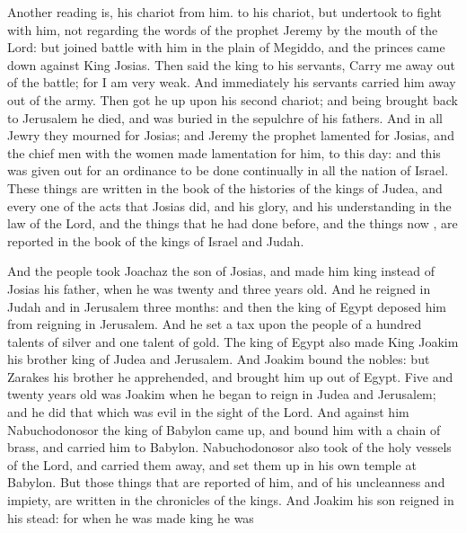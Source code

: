 {{Another reading is,
his chariot from him.} to his chariot, but undertook to fight with him, not regarding the words of the prophet Jeremy
{} by the mouth of the Lord:
but joined battle with him in the plain of Megiddo, and the princes came down against King Josias.
Then said the king to his servants, Carry me away out of the battle; for I am very weak. And immediately his servants carried him away out of the army.
Then got he up upon his second chariot; and being brought back to Jerusalem he died, and was buried in the sepulchre of his fathers.
And in all Jewry they mourned for Josias; and Jeremy the prophet lamented for Josias, and the chief men with the women made lamentation for him, to this day: and this was given out for an ordinance to be done continually in all the nation of Israel.
These things are written in the book of the histories of the kings of Judea, and every one of the acts that Josias did, and his glory, and his understanding in the law of the Lord, and the things that he had done before, and the things now
{}, are reported in the book of the kings of Israel and Judah.
\par }{\PP {} And the people took
 Joachaz the son of Josias, and made him king instead of Josias his father, when he was twenty and three years old.
And he reigned in
 Judah and in Jerusalem three months: and then the king of Egypt deposed him from reigning in Jerusalem.
And he set a tax upon the people of a hundred talents of silver and one talent of gold.
The king of Egypt also made King Joakim his brother king of Judea and Jerusalem.
And Joakim bound the nobles: but Zarakes his brother he apprehended, and brought him up out of Egypt.
Five and twenty years old was
 Joakim when he began to reign in Judea and Jerusalem; and he did that which was evil in the sight of the Lord.
And against him Nabuchodonosor the king of Babylon came up, and bound him with a chain of brass, and carried him to Babylon.
Nabuchodonosor also took of the holy vessels of the Lord, and carried them away, and set them up in his own temple at Babylon.
But those things that are reported of him, and of his uncleanness and impiety, are written in the chronicles of the kings.
And Joakim his son reigned in his stead: for when he was made king he was
}
